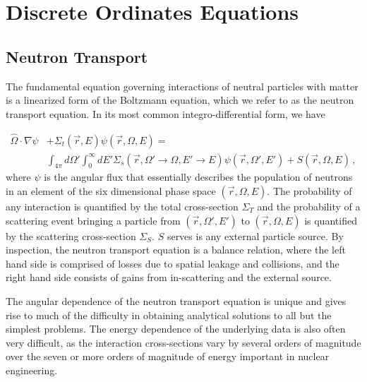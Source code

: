 \documentclass[final,3p,times,11pt]{elsarticle}
\begin{document}
\section{Discrete Ordinates Equations}

\subsection{Neutron Transport}

  The fundamental equation governing interactions of neutral particles with matter is a linearized form of the Boltzmann equation, which we refer to as the neutron transport equation.  In its most common integro-differential form, we have

  \begin{equation}
  \begin{split} 
     \hat{\Omega} \cdot \nabla \psi &+ \Sigma_t(\vec{r},E) \psi(\vec{r},\Omega,E) = \\
         & \int_{4\pi}d\Omega' \int^{\infty}_{0}dE' \Sigma_s(\vec{r},\Omega' \to \Omega, E'\to E) \psi (\vec{r},\Omega',E') + S(\vec{r},\Omega,E) \, ,
  \end{split}
  \end{equation}
  where $\psi$ is the angular flux that essentially describes the population of neutrons in an element of the six dimensional phase space $(\vec{r},\Omega,E)$.  The probability of any interaction is quantified by the total cross-section $\Sigma_T$ and the probability of a scattering event bringing a particle from $(\vec{r},\Omega',E')$ to $(\vec{r},\Omega,E)$ is quantified by the scattering cross-section $\Sigma_S$.  $S$ serves is any external particle source.  By inspection, the neutron transport equation is a balance relation, where the left hand side is comprised of losses due to spatial leakage and collisions, and the right hand side consists of gains from in-scattering and the external source.

  The angular dependence of the neutron transport equation is unique and gives rise to much of the difficulty in obtaining analytical solutions to all but the simplest problems.  The energy dependence of the underlying data is also often very difficult, as the interaction cross-sections vary by several orders of magnitude over the seven or more orders of magnitude of energy important in nuclear engineering.
\end{document}

